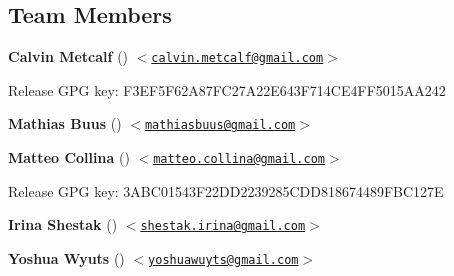 \label{_members}%
 \subsection*{Team Members}


\begin{DoxyItemize}
\item {\bfseries Calvin Metcalf} (\href{https://github.com/calvinmetcalf}{\tt }) $<$\href{mailto:calvin.metcalf@gmail.com}{\tt calvin.\+metcalf@gmail.\+com}$>$
\begin{DoxyItemize}
\item Release G\+PG key\+: F3\+E\+F5\+F62\+A87\+F\+C27\+A22\+E643\+F714\+C\+E4\+F\+F5015\+A\+A242
\end{DoxyItemize}
\item {\bfseries Mathias Buus} (\href{https://github.com/mafintosh}{\tt }) $<$\href{mailto:mathiasbuus@gmail.com}{\tt mathiasbuus@gmail.\+com}$>$
\item {\bfseries Matteo Collina} (\href{https://github.com/mcollina}{\tt }) $<$\href{mailto:matteo.collina@gmail.com}{\tt matteo.\+collina@gmail.\+com}$>$
\begin{DoxyItemize}
\item Release G\+PG key\+: 3\+A\+B\+C01543\+F22\+D\+D2239285\+C\+D\+D818674489\+F\+B\+C127E
\end{DoxyItemize}
\item {\bfseries Irina Shestak} (\href{https://github.com/lrlna}{\tt }) $<$\href{mailto:shestak.irina@gmail.com}{\tt shestak.\+irina@gmail.\+com}$>$
\item {\bfseries Yoshua Wyuts} (\href{https://github.com/yoshuawuyts}{\tt }) $<$\href{mailto:yoshuawuyts@gmail.com}{\tt yoshuawuyts@gmail.\+com}$>$ 
\end{DoxyItemize}